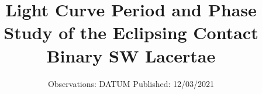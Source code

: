 

\subject{Final Paper for Observational Astronomy AST401L}
\title{Light Curve Period and Phase Study of the Eclipsing Contact Binary SW Lacertae}
\date{%
  Observations: DATUM
  \hspace{3em}
  Published: 12/03/2021
}



\maketitle
\thispagestyle{empty}
\tableofcontents
\newpage







\printbibliography{}


